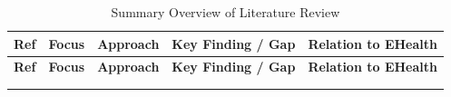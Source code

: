 \vspace{3mm}
{
\renewcommand{\arraystretch}{1.3}
\begin{xltabular}{\textwidth}{|>{\centering\arraybackslash}p{0.8cm}|>{\raggedright\arraybackslash}p{2.0cm}|>{\raggedright\arraybackslash}p{2.2cm}|>{\raggedright\arraybackslash}X|>{\raggedright\arraybackslash}p{3.5cm}|}

\hline
\textbf{Ref} & \textbf{Focus} & \textbf{Approach} & \textbf{Key Finding / Gap} & \textbf{Relation to EHealth} \\
\hline
\endfirsthead

\hline
\textbf{Ref} & \textbf{Focus} & \textbf{Approach} & \textbf{Key Finding / Gap} & \textbf{Relation to EHealth} \\
\hline
\endhead


\hline
\caption{Summary Overview of Literature Review} \label{tab:lit_review} \\
\endlastfoot



\end{xltabular}}
